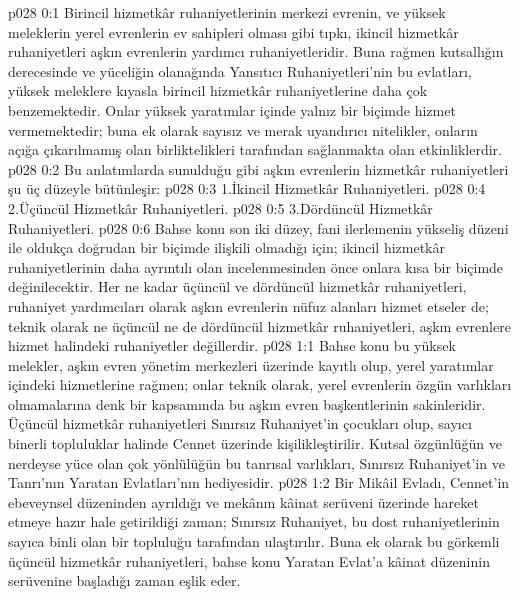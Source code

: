 \vs p028 0:1 Birincil hizmetkâr ruhaniyetlerinin merkezi evrenin, ve yüksek meleklerin yerel evrenlerin ev sahipleri olması gibi tıpkı, ikincil hizmetkâr ruhaniyetleri aşkın evrenlerin yardımcı ruhaniyetleridir. Buna rağmen kutsallığın derecesinde ve yüceliğin olanağında Yansıtıcı Ruhaniyetleri’nin bu evlatları, yüksek meleklere kıyasla birincil hizmetkâr ruhaniyetlerine daha çok benzemektedir. Onlar yüksek yaratımlar içinde yalnız bir biçimde hizmet vermemektedir; buna ek olarak sayısız ve merak uyandırıcı nitelikler, onların açığa çıkarılmamış olan birliktelikleri tarafından sağlanmakta olan etkinliklerdir.
\vs p028 0:2 Bu anlatımlarda sunulduğu gibi aşkın evrenlerin hizmetkâr ruhaniyetleri şu üç düzeyle bütünleşir:
\vs p028 0:3 1.\bibnobreakspace İkincil Hizmetkâr Ruhaniyetleri.
\vs p028 0:4 2.\bibnobreakspace Üçüncül Hizmetkâr Ruhaniyetleri.
\vs p028 0:5 3.\bibnobreakspace Dördüncül Hizmetkâr Ruhaniyetleri.
\vs p028 0:6 Bahse konu son iki düzey, fani ilerlemenin yükseliş düzeni ile oldukça doğrudan bir biçimde ilişkili olmadığı için; ikincil hizmetkâr ruhaniyetlerinin daha ayrıntılı olan incelenmesinden önce onlara kısa bir biçimde değinilecektir. Her ne kadar üçüncül ve dördüncül hizmetkâr ruhaniyetleri, ruhaniyet yardımcıları olarak aşkın evrenlerin nüfuz alanları  hizmet etseler de; teknik olarak ne üçüncül ne de dördüncül hizmetkâr ruhaniyetleri, aşkın evrenlere  hizmet halindeki ruhaniyetler değillerdir.
\vs p028 1:1 Bahse konu bu yüksek melekler, aşkın evren yönetim merkezleri üzerinde kayıtlı olup, yerel yaratımlar içindeki hizmetlerine rağmen; onlar teknik olarak, yerel evrenlerin özgün varlıkları olmamalarına denk bir kapsamında bu aşkın evren başkentlerinin sakinleridir. Üçüncül hizmetkâr ruhaniyetleri Sınırsız Ruhaniyet’in çocukları olup, sayıcı binerli topluluklar halinde Cennet üzerinde kişilikleştirilir. Kutsal özgünlüğün ve nerdeyse yüce olan çok yönlülüğün bu tanrısal varlıkları, Sınırsız Ruhaniyet’in ve Tanrı’nın Yaratan Evlatları’nın hediyesidir.
\vs p028 1:2 Bir Mikâil Evladı, Cennet’in ebeveynsel düzeninden ayrıldığı ve mekânın kâinat serüveni üzerinde hareket etmeye hazır hale getirildiği zaman; Sınırsız Ruhaniyet, bu dost ruhaniyetlerinin sayıca binli olan bir topluluğu tarafından ulaştırılır. Buna ek olarak bu görkemli üçüncül hizmetkâr ruhaniyetleri, bahse konu Yaratan Evlat’a kâinat düzeninin serüvenine başladığı zaman eşlik eder.

